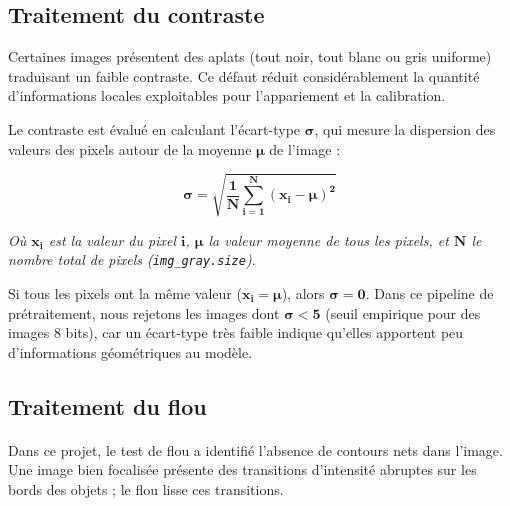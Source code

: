 \documentclass[12pt,a4paper,oneside]{report}
\begin{document}
\vspace{0.5cm}

\subsection{Traitement du contraste}

\hspace{1cm}Certaines images présentent des aplats (tout noir, tout blanc ou gris uniforme) traduisant un faible contraste. Ce défaut réduit considérablement la quantité d'informations locales exploitables pour l'appariement et la calibration. 

\hspace{1cm}Le contraste est évalué en calculant l'écart-type $\bm{\sigma}$, qui mesure la dispersion des valeurs des pixels autour de la moyenne $\bm{\mu}$ de l'image :

\begin{small} %
\[
\bm{\sigma = \sqrt{\frac{1}{N} \sum_{i=1}^{N} (x_i - \mu)^2}}
\]
\end{small}

\textit{Où $\bm{x_i}$ est la valeur du pixel $\bm{i}$, $\bm{\mu}$ la valeur moyenne de tous les pixels, et $\bm{N}$ le nombre total de pixels (\texttt{img\_gray.size}).}

\vspace{0.1cm}

\hspace{0.5cm}Si tous les pixels ont la même valeur ($\bm{x_i = \mu}$), alors $\bm{\sigma=0}$. Dans ce pipeline de prétraitement, nous rejetons les images dont $\bm{\sigma < 5}$ (seuil empirique pour des images 8 bits), car un écart-type très faible indique qu'elles apportent peu d'informations géométriques au modèle.

\newpage

\subsection{Traitement du flou}

\vspace{1cm}

\paragraph{}
Dans ce projet, le test de flou a identifié l'absence de contours nets dans l'image. Une image bien focalisée présente des transitions d'intensité abruptes sur les bords des objets ; le flou lisse ces transitions.
\end{document}
